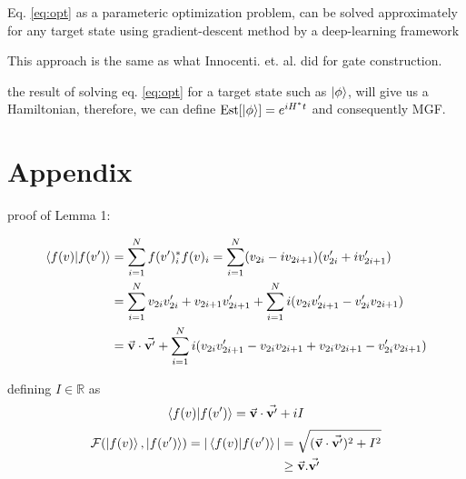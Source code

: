 \documentclass{article}
\DeclareMathOperator*{\est}{Est}
\begin{document}
Eq. \ref{eq:opt} as a parameteric optimization problem, can be solved approximately for any target state using gradient-descent method by a deep-learning framework

This approach is the same as what Innocenti. et. al. did for gate construction.

the result of solving eq. \ref{eq:opt} for a target state such as $\ket{\phi}$, will give us a Hamiltonian, therefore, we can define $\est[\ket{\phi}] = e^{iH^*t}$ and consequently MGF.

\section*{Appendix}
proof of Lemma 1:

\begin{align*} \braket{f(v)}{f(v')} &= \sum_{i=1}^N f(v')_i^* f(v)_i = \sum_{i=1}^N (v_{2i} - iv_{2i+1}) (v'_{2i} + iv'_{2i+1}) \\
& = \sum_{i=1}^N v_{2i}v'_{2i} + v_{2i+1}v'_{2i+1} +  \sum_{i=1}^N i(v_{2i}v'_{2i+1} - v'_{2i}v_{2i+1}) \\
& = \va{v}\cdot\va{v'} + \sum_{i=1}^N i(v_{2i}v'_{2i+1} - v_{2i}v_{2i+1} + v_{2i}v_{2i+1}- v'_{2i}v_{2i+1}) \end{align*}

defining $I \in \mathbb{R}$ as
\[ \braket{f(v)}{f(v')} = \va{v}\cdot\va{v'} + iI \]
\begin{align*} \mathcal{F}(\ket{f(v)}, \ket{f(v')}) = |\braket{f(v)}{f(v')}| &= \sqrt{(\va{v}\cdot\va{v'})^2 + I^2} \\
& \ge \va{v}.\va{v'}
\end{align*}
\end{document}
